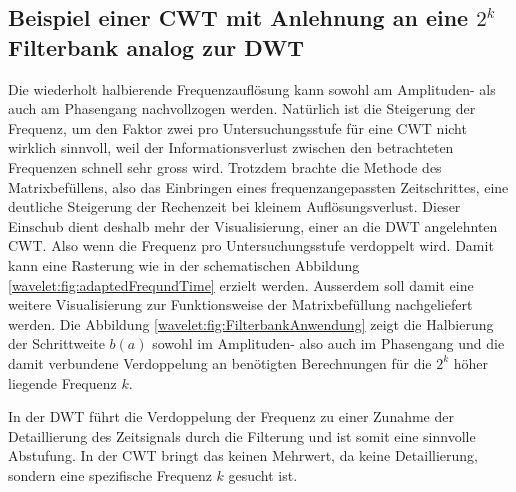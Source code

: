 
\subsection{Beispiel einer CWT mit Anlehnung an eine $2^k$ Filterbank analog zur DWT
	\label{wavelets:subsection:Radix2CWT}}
Die wiederholt halbierende Frequenzauflösung kann sowohl am Amplituden- als auch am Phasengang nachvollzogen werden. Natürlich ist die Steigerung der Frequenz, um den Faktor zwei pro Untersuchungsstufe für eine CWT nicht wirklich sinnvoll, weil der Informationsverlust zwischen den betrachteten Frequenzen schnell sehr gross wird. Trotzdem brachte die Methode des Matrixbefüllens, also das Einbringen eines frequenzangepassten Zeitschrittes, eine deutliche Steigerung der Rechenzeit bei kleinem Auflösungsverlust.
Dieser Einschub dient deshalb mehr der Visualisierung, einer an die DWT angelehnten CWT. Also wenn die Frequenz pro Untersuchungsstufe verdoppelt wird. Damit kann eine Rasterung wie in der schematischen Abbildung \ref{wavelet:fig:adaptedFrequndTime} erzielt werden. Ausserdem soll damit eine weitere Visualisierung zur Funktionsweise der Matrixbefüllung nachgeliefert werden. Die Abbildung \ref{wavelet:fig:FilterbankAnwendung} zeigt die Halbierung der Schrittweite $b(a)$ sowohl im Amplituden- also auch im Phasengang und die damit verbundene Verdoppelung an benötigten Berechnungen für die $2^k$ höher liegende Frequenz $k$.

In der DWT führt die Verdoppelung der Frequenz zu einer Zunahme der Detaillierung des Zeitsignals durch die Filterung und ist somit eine sinnvolle Abstufung. In der CWT bringt das keinen Mehrwert, da keine Detaillierung, sondern eine spezifische Frequenz $k$ gesucht ist.
 
